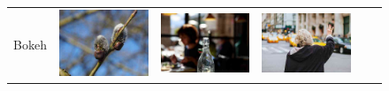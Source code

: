 \begin{figure}
\centering
\begin{minipage}[t]{\textwidth}
    \begin{tabular}{m{.01\linewidth} m{.16\linewidth} m{.16\linewidth} m{.16\linewidth} m{.16\linewidth} m{.16\linewidth}}
    \begin{turn}{90}\small{Bokeh}\end{turn} &
    \includegraphics[width=\linewidth]{../style/figures/flickr_on_flickr/pred_style_Bokeh/0.jpg} &
    \includegraphics[width=\linewidth]{../style/figures/flickr_on_flickr/pred_style_Bokeh/1.jpg} &
    \includegraphics[width=\linewidth]{../style/figures/flickr_on_flickr/pred_style_Bokeh/2.jpg} &

\end{tabular}
\end{minipage}
\end{figure}
